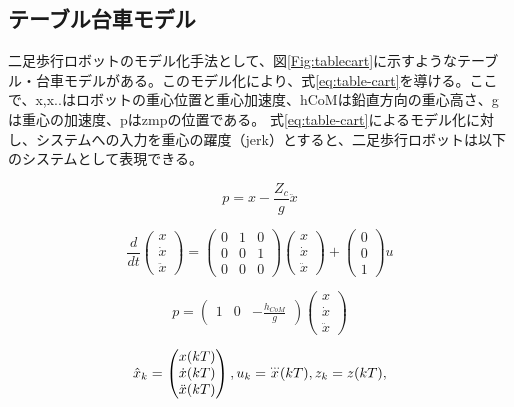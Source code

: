 \subsection{テーブル台車モデル}
二足歩行ロボットのモデル化手法として、図\ref{Fig:tablecart}に示すようなテーブル・台車モデルがある。このモデル化により、式\eqref{eq:table-cart}を導ける。ここで、x,x..はロボットの重心位置と重心加速度、hCoMは鉛直方向の重心高さ、gは重心の加速度、pはzmpの位置である。
式\eqref{eq:table-cart}によるモデル化に対し、システムへの入力を重心の躍度（jerk）とすると、二足歩行ロボットは以下のシステムとして表現できる。

\begin{equation}
  p = x - \frac{Z_{c}}{g}\ddot{x}
  \label{eq:table-cart}
\end{equation}


\begin{equation}
  \frac{d}{dt}\begin{pmatrix}
    x \\ \dot{x} \\ \ddot{x}
  \end{pmatrix}
  =
  \begin{pmatrix}
    0 & 1 & 0 \\ 0 & 0 & 1 \\ 0 & 0 & 0
  \end{pmatrix}
  \begin{pmatrix}
    x \\ \dot{x} \\ \ddot{x}
  \end{pmatrix}
  +
  \begin{pmatrix}
    0 \\ 0 \\ 1
  \end{pmatrix}
  u
  \label{eq:teble-cart-system-state}
\end{equation}

\begin{equation}
  p = \begin{pmatrix}
    1 & 0 & -\frac{h_{CoM}}{g}
  \end{pmatrix}
  \begin{pmatrix}
    x \\ \dot{x} \\ \ddot{x}
  \end{pmatrix}
  \label{eq:teble-cart-system-output}
\end{equation}



\begin{equation}
  \hat{x}_{k}=
  \begin{pmatrix}
    x(kT)\cr \dot{x}(kT)\cr\ddot{x}(kT)
  \end{pmatrix}
  ,
  u_{k}
    =
    {\buildrel\ldots\over{x}}(kT)
  , z_{k}=z(kT),
\end{equation}

